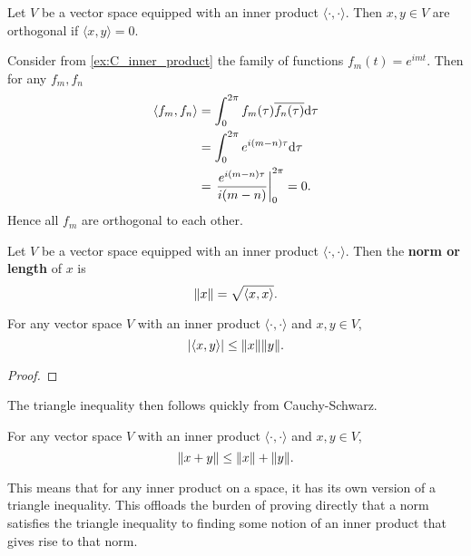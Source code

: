 \documentclass{subfiles}
\begin{document}
\begin{definition}
    \label{def:orthogonal_vectors}
    Let $V$ be a vector space equipped with an inner product $\langle \cdot, \cdot \rangle$. Then $x,y \in V$ are orthogonal if $\langle x, y \rangle = 0$.
\end{definition}

\begin{example}
    Consider from \ref{ex:C_inner_product} the family of functions $f_m(t) = e^{i m t}$. Then for any $f_m, f_n$
    \begin{align*}
        \langle f_m, f_n \rangle &= \int_0^{2 \pi} f_m(\tau) \conj{f_n(\tau)} \dd \tau \\
                                 &= \int_0^{2 \pi} e^{i (m - n) \tau} \dd \tau \\
                                 &= \eval{\frac{e^{i (m-n) \tau}}{i (m-n)}}_0^{2 \pi} = 0.
    \end{align*}
    Hence all $f_m$ are orthogonal to each other.
\end{example}

\begin{definition}
    Let $V$ be a vector space equipped with an inner product $\langle \cdot, \cdot \rangle$. Then the \textbf{norm or length} of $x$ is
    \[
        \norm{x} = \sqrt{ \langle x, x \rangle }
    .\]
\end{definition}

\begin{theorem}
    \label{thm:cauchyshwartz}
    For any vector space $V$ with an inner product $\langle \cdot , \cdot \rangle$ and $x,y \in V$,
    \[
        \abs{\langle x, y \rangle} \leq \norm{x} \norm{y}
    .\]
\end{theorem}

\begin{proof}
\end{proof}

\noindent
The triangle inequality then follows quickly from Cauchy-Schwarz.

\begin{theorem}
    \label{thm:tri_inquality}
    For any vector space $V$ with an inner product $\langle \cdot , \cdot \rangle$ and $x,y \in V$,
    \[
        \norm{x + y} \leq \norm{x} + \norm{y}
    .\]
\end{theorem}

This means that for any inner product on a space, it has its own version of a triangle inequality. This offloads the burden of proving directly that a norm satisfies the triangle inequality to finding some notion of an inner product that gives rise to that norm. 
\end{document}
